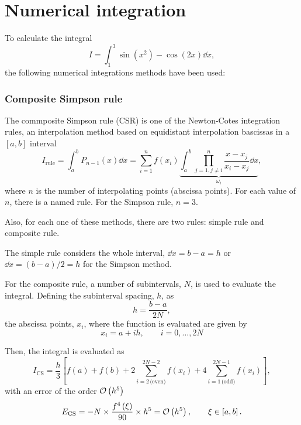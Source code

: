 \graphicspath{{./figures/}}
\part{Numerical integration}
To calculate the integral 
\begin{equation}\label{eq:integral}
    I = \int_1^3 \sin \left( x^2 \right) - \cos \left( 2x \right) \dd{x},
\end{equation}
the following numerical integrations methods have been used:

\section{Composite Simpson rule}
The commposite Simpson rule (CSR) is one of the Newton-Cotes integration rules,
an interpolation method based on equidistant interpolation bascissas in a $\left[ a,b \right]$ 
interval 
\begin{equation}
    I_{\text{rule}} 
    = \int_a^b P_{n-1} \left( x \right) \dd{x} 
    = \sum_{i = 1}^{n} f\left( x_i \right) \underbrace{\int_a^b \prod_{j=1,j\not=i}^{n} \frac{ x - x_j }{x_i - x_j} \dd{x}}_{\omega_i} ,
\end{equation}
where $n$ is the number of interpolating points (abscissa points). 
For each value of $n$, there is a named rule. For the Simpson rule, $n = 3$.

Also, for each one of these methods, there are two rules: simple rule and composite rule.

The simple rule considers the whole interval, $\dd{x} = b - a = h$ or $\dd{x} = (b - a) / 2 = h$ 
for the Simpson method.

For the composite rule, a number of subintervals, $N$, is used to evaluate the integral. 
Defining the subinterval spacing, $h$, as 
\begin{equation}
    h = \frac{ b - a }{2N},
\end{equation}
the abscissa points, $x_i$, where the function is evaluated are given by 
\begin{equation}
    x_i = a + ih, \qquad i = 0, \ldots , 2N
\end{equation}

Then, the integral is evaluated as 
\begin{equation}
    I_{\text{CS}} =
    \frac{h}{3} \left[ f\left( a \right) + f\left( b \right) +
    2 \sum_{i = 2\, \text{(even)}}^{2N - 2} f\left( x_i \right) +
    4 \sum_{i = 1\, \text{(odd)}}^{2N - 1}  f\left( x_i \right) \right],
\end{equation}
with an error of the order $\mathcal{O} \left( h^5 \right)$
\begin{equation}
    E_{\text{CS}} =
    - N \times \frac{ f^4 \left( \xi \right) }{90} \times h^5 
    = \mathcal{O} \left( h^5 \right),
    \qquad \xi \in \left[ a,b \right].
\end{equation}


